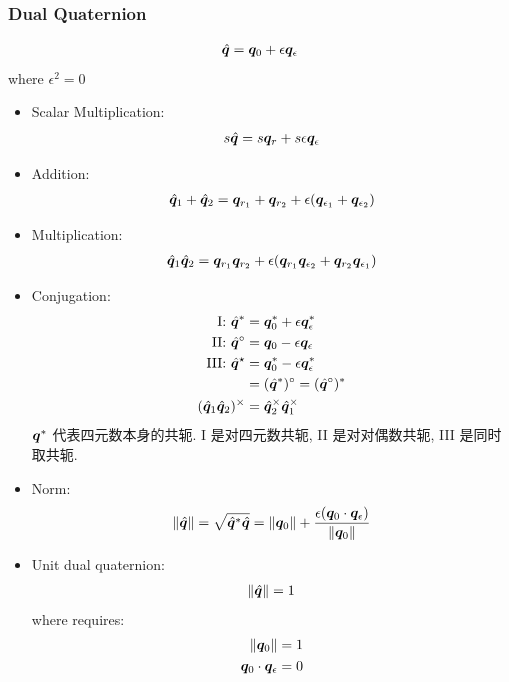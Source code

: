 \subsubsection{Dual Quaternion}

\begin{definition}
    \begin{align*}
        \hat{{\bm{q}}} = {\bm{q}}_0 + \epsilon {\bm{q}}_\epsilon
    \end{align*}
    where $\epsilon^2=0$
\end{definition}

\begin{itemize}
    \item Scalar Multiplication:
    \begin{align*}
        s\hat{{\bm{q}}} = s{\bm{q}}_r + s \epsilon {\bm{q}}_\epsilon 
    \end{align*}
    \item Addition: 
    \begin{align*}
        \hat{{\bm{q}}}_1+\hat{{\bm{q}}}_2 = {\bm{q}}_{r_1} + {\bm{q}}_{r_2} + \epsilon({\bm{q}}_{\epsilon_1} + {\bm{q}}_{\epsilon_2})
    \end{align*}
    \item Multiplication: 
    \begin{align*}
        \hat{{\bm{q}}}_1\hat{{\bm{q}}}_2 = {\bm{q}}_{r_1}{\bm{q}}_{r_2}  + \epsilon ({\bm{q}}_{r_1}{\bm{q}}_{\epsilon_2}+{\bm{q}}_{r_2}{\bm{q}}_{\epsilon_1} )
    \end{align*}
    \item Conjugation:
    \begin{align*}
        \text{I: }\hat{{\bm{q}}}^* & = {\bm{q}}_0^* + \epsilon {\bm{q}}_\epsilon^*\\
        \text{II: }\hat{{\bm{q}}}^\circ & = {\bm{q}}_0 - \epsilon {\bm{q}}_\epsilon\\
        \text{III: }\hat{{\bm{q}}}^\star & = {\bm{q}}_0^* - \epsilon {\bm{q}}_\epsilon^*\\
        &= (\hat{{\bm{q}}}^*)^\circ =  (\hat{{\bm{q}}}^\circ)^* \\
        (\hat{{\bm{q}}}_1\hat{{\bm{q}}}_2)^\times &= \hat{{\bm{q}}}_2^\times\hat{{\bm{q}}}_1^\times
    \end{align*}
    ${\bm{q}}^*$ 代表四元数本身的共轭. I 是对四元数共轭,  II 是对对偶数共轭, III 是同时取共轭.
    \item Norm:
    \begin{align*}
        \left\lVert\hat{{\bm{q}}}\right\rVert= \sqrt{\hat{{\bm{q}}}^*\hat{{\bm{q}}}}=\left\lVert{\bm{q}}_0\right\rVert+ \frac{\epsilon({\bm{q}}_0\cdot {\bm{q}}_\epsilon)}{\left\lVert{\bm{q}}_0\right\rVert}
    \end{align*}
    \item Unit dual quaternion:
    \begin{align*}
        \left\lVert\hat{{\bm{q}}}\right\rVert = 1
    \end{align*}
    where requires:
    \begin{align*}
        \left\lVert{\bm{q}}_0\right\rVert &= 1\\
        {\bm{q}}_0 \cdot {\bm{q}}_\epsilon&=0
    \end{align*}
\end{itemize}

